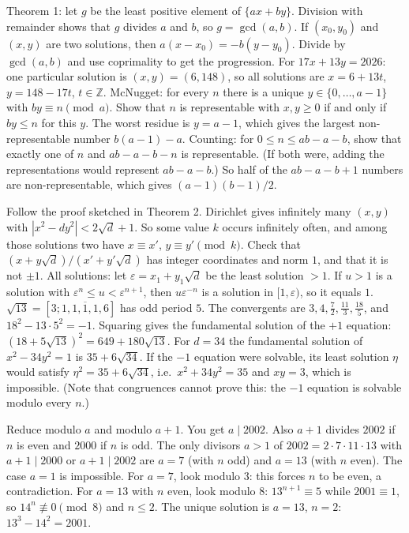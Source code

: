 \documentclass[11pt,a4paper]{article}
\begin{document}

 Theorem 1: let $g$ be the least positive element of $\{ax+by\}$. Division with remainder shows that $g$ divides $a$ and $b$, so $g=\gcd(a,b)$. If $(x_0,y_0)$ and $(x,y)$ are two solutions, then $a(x-x_0)=-b(y-y_0)$. Divide by $\gcd(a,b)$ and use coprimality to get the progression.
 For $17x+13y=2026$: one particular solution is $(x,y)=(6,148)$, so all solutions are $x=6+13t$, $y=148-17t$, $t\in\mathbb Z$.
 McNugget: for every $n$ there is a unique $y\in\{0,\dots,a-1\}$ with $by\equiv n\pmod a$. Show that $n$ is representable with $x,y\ge0$ if and only if $by\le n$ for this $y$. The worst residue is $y=a-1$, which gives the largest non-representable number $b(a-1)-a$.
 Counting: for $0\le n\le ab-a-b$, show that exactly one of $n$ and $ab-a-b-n$ is representable. (If both were, adding the representations would represent $ab-a-b$.) So half of the $ab-a-b+1$ numbers are non-representable, which gives $(a-1)(b-1)/2$.

 Follow the proof sketched in Theorem 2. Dirichlet gives infinitely many $(x,y)$ with $|x^2-dy^2|<2\sqrt d+1$. So some value $k$ occurs infinitely often, and among those solutions two have $x\equiv x'$, $y\equiv y'\pmod k$. Check that $(x+y\sqrt d)/(x'+y'\sqrt d)$ has integer coordinates and norm $1$, and that it is not $\pm1$.
 All solutions: let $\varepsilon=x_1+y_1\sqrt d$ be the least solution $>1$. If $u>1$ is a solution with $\varepsilon^n\le u<\varepsilon^{n+1}$, then $u\varepsilon^{-n}$ is a solution in $[1,\varepsilon)$, so it equals $1$.
 $\sqrt{13}=[3;\overline{1,1,1,1,6}]$ has odd period $5$. The convergents are $3,4,\frac72,\frac{11}3,\frac{18}5$, and $18^2-13\cdot5^2=-1$. Squaring gives the fundamental solution of the $+1$ equation: $(18+5\sqrt{13})^2=649+180\sqrt{13}$.
 For $d=34$ the fundamental solution of $x^2-34y^2=1$ is $35+6\sqrt{34}$. If the $-1$ equation were solvable, its least solution $\eta$ would satisfy $\eta^2=35+6\sqrt{34}$, i.e.\ $x^2+34y^2=35$ and $xy=3$, which is impossible. (Note that congruences cannot prove this: the $-1$ equation is solvable modulo every $n$.)

 Reduce modulo $a$ and modulo $a+1$. You get $a\mid2002$. Also $a+1$ divides $2002$ if $n$ is even and $2000$ if $n$ is odd.
 The only divisors $a>1$ of $2002=2\cdot7\cdot11\cdot13$ with $a+1\mid2000$ or $a+1\mid2002$ are $a=7$ (with $n$ odd) and $a=13$ (with $n$ even). The case $a=1$ is impossible.
 For $a=7$, look modulo $3$: this forces $n$ to be even, a contradiction. For $a=13$ with $n$ even, look modulo $8$: $13^{n+1}\equiv5$ while $2001\equiv1$, so $14^n\not\equiv0\pmod 8$ and $n\le2$. The unique solution is $a=13$, $n=2$: $13^3-14^2=2001$.
\end{document}
